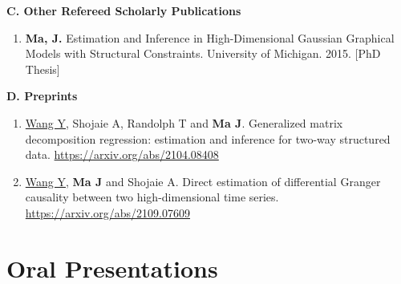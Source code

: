 \documentclass[10pt]{article}
\begin{document}
\textbf{C. Other Refereed Scholarly Publications}
\begin{enumerate}
\item \textbf{Ma, J.} Estimation and Inference in High-Dimensional Gaussian Graphical Models  with Structural Constraints. University of Michigan. 2015. [PhD Thesis]
\end{enumerate}

\textbf{D.  Preprints}
\begin{enumerate}
\item \underline{Wang Y}, Shojaie A, Randolph T and \textbf{Ma J}. Generalized matrix decomposition regression: estimation and inference for two-way structured data. \url{https://arxiv.org/abs/2104.08408}
\item \underline{Wang Y}, \textbf{Ma J} and Shojaie A. Direct estimation of differential Granger causality between two high-dimensional time series.  \url{https://arxiv.org/abs/2109.07609}
\end{enumerate}



\section*{Oral Presentations}
\end{document}
